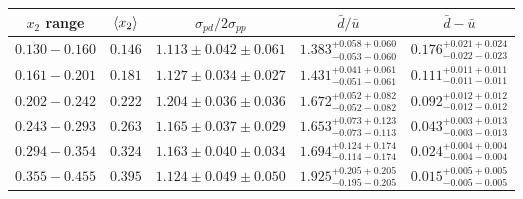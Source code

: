 {
\renewcommand{\arraystretch}{1.5}
\begin{tabular}{ccccc}
	\hline\hline
	$x_{2}$ range & $\expval{x_{2}}$ & $\sigma_{pd}/2\sigma_{pp}$ & $\bar{d}/\bar{u}$                     & $\bar{d}-\bar{u}$                     \\ \hline
	$0.130-0.160$ & $0.146$          & $1.113\pm0.042\pm0.061$    & $1.383^{+0.058+0.060}_{-0.053-0.060}$ & $0.176^{+0.021+0.024}_{-0.022-0.023}$ \\
	$0.161-0.201$ & $0.181$          & $1.127\pm0.034\pm0.027$    & $1.431^{+0.041+0.061}_{-0.051-0.061}$ & $0.111^{+0.011+0.011}_{-0.011-0.011}$ \\
	$0.202-0.242$ & $0.222$          & $1.204\pm0.036\pm0.036$    & $1.672^{+0.052+0.082}_{-0.052-0.082}$ & $0.092^{+0.012+0.012}_{-0.012-0.012}$ \\
	$0.243-0.293$ & $0.263$          & $1.165\pm0.037\pm0.029$    & $1.653^{+0.073+0.123}_{-0.073-0.113}$ & $0.043^{+0.003+0.013}_{-0.003-0.013}$ \\
	$0.294-0.354$ & $0.324$          & $1.163\pm0.040\pm0.034$    & $1.694^{+0.124+0.174}_{-0.114-0.174}$ & $0.024^{+0.004+0.004}_{-0.004-0.004}$ \\
	$0.355-0.455$ & $0.395$          & $1.124\pm0.049\pm0.050$    & $1.925^{+0.205+0.205}_{-0.195-0.205}$ & $0.015^{+0.005+0.005}_{-0.005-0.005}$ \\ \hline\hline
\end{tabular}
}
